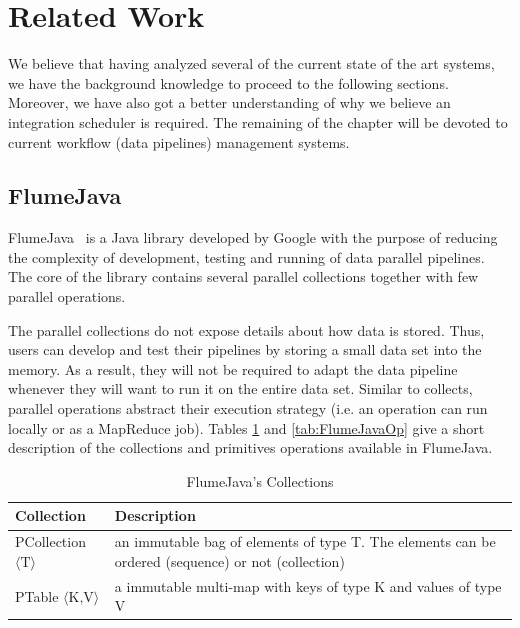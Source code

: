 \documentclass[11pt,a4paper,twoside]{report}
\begin{document}
\section{Related Work}
We believe that having analyzed several of the current state of the art systems, we have the background knowledge to proceed to the following sections. Moreover, we have also got a better understanding of why we believe an integration scheduler is required. The remaining of the chapter will be devoted to current workflow (data pipelines) management systems.


\subsection{FlumeJava}
FlumeJava~\cite{FlumeJava} is a Java library developed by Google with the purpose of reducing the complexity of development, testing and running of data parallel pipelines. The core of the library contains several parallel collections together with few parallel operations.


The parallel collections do not expose details about how data is stored. Thus, users can develop and test their pipelines by storing a small data set into the memory. As a result, they will not be required to adapt the data pipeline whenever they will want to run it on the entire data set. Similar to collects, parallel operations abstract their execution strategy (i.e. an operation can run locally or as a MapReduce job). Tables \ref{tab:FlumeJavaCol} and \ref{tab:FlumeJavaOp} give a short description of the collections and primitives operations available in FlumeJava.

\begin{table}[h]
\centering
\begin{tabular}{|l|p{8.5cm}|}
\hline
\textbf{Collection} & \textbf{Description} \\ \hline
PCollection \(\langle \text{T} \rangle\) & an immutable bag of elements of type
T. The elements can be ordered (sequence) or not (collection) \\ \hline
PTable \(\langle \text{K,V} \rangle\) & a immutable multi-map with keys of type
K and values of type V \\ \hline
\end{tabular}
\caption{FlumeJava's Collections}
\label{tab:FlumeJavaCol}
\end{table}
\end{document}
